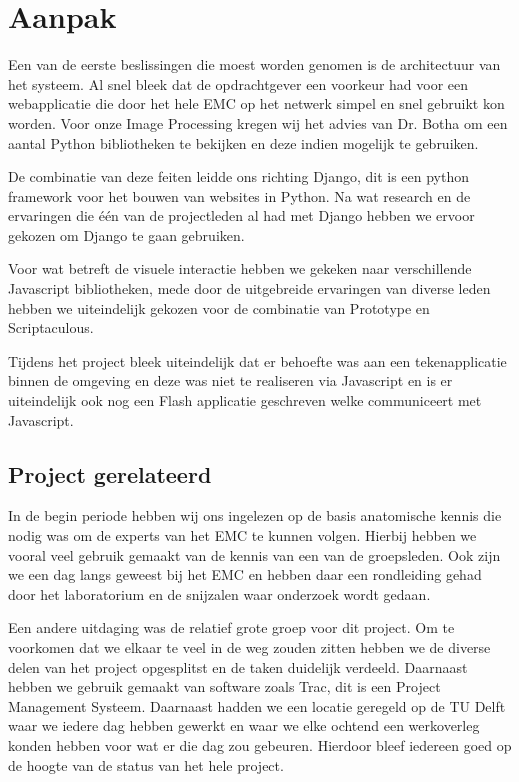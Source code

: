 \section{Aanpak}
\label{Aanpak}
Een van de eerste beslissingen die moest worden genomen is de architectuur van het systeem. Al snel bleek dat de opdrachtgever een voorkeur had voor een webapplicatie die door het hele EMC op het netwerk simpel en snel gebruikt kon worden. 
Voor onze Image Processing kregen wij het advies van Dr. Botha om een aantal Python bibliotheken te bekijken en deze indien mogelijk te gebruiken. 

De combinatie van deze feiten leidde ons richting Django, dit is een python framework voor het bouwen van websites in Python. Na wat research en de ervaringen die \'{e}\'{e}n van de projectleden al had met Django hebben we ervoor gekozen om Django te gaan gebruiken. 

Voor wat betreft de visuele interactie hebben we gekeken naar verschillende Javascript bibliotheken, mede door de uitgebreide ervaringen van diverse leden hebben we uiteindelijk gekozen voor de combinatie van Prototype en Scriptaculous.

Tijdens het project bleek uiteindelijk dat er behoefte was aan een tekenapplicatie binnen de omgeving en deze was niet te realiseren via Javascript en is er uiteindelijk ook nog een Flash applicatie geschreven welke communiceert met Javascript.

\subsection{Project gerelateerd}
In de begin periode hebben wij ons ingelezen op de basis anatomische kennis die nodig was om de experts van het EMC te kunnen volgen. Hierbij hebben we vooral veel gebruik gemaakt van de kennis van een van de groepsleden. Ook zijn we een dag langs geweest bij het EMC en hebben daar een rondleiding gehad door het laboratorium en de snijzalen waar onderzoek wordt gedaan. 

Een andere uitdaging was de relatief grote groep voor dit project. Om te voorkomen dat we elkaar te veel in de weg zouden zitten hebben we de diverse delen van het project opgesplitst en de taken duidelijk verdeeld. Daarnaast hebben we gebruik gemaakt van software zoals Trac, dit is een Project Management Systeem. Daarnaast hadden we een locatie geregeld op de TU Delft waar we iedere dag hebben gewerkt en waar we elke ochtend een werkoverleg konden hebben voor wat er die dag zou gebeuren. Hierdoor bleef iedereen goed op de hoogte van de status van het hele project.

